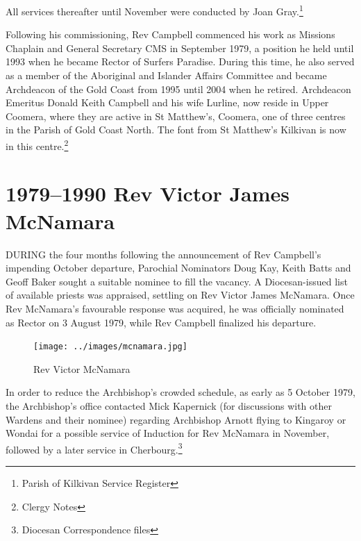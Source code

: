 All services thereafter until November were conducted by Joan Gray.\footnote{Parish of Kilkivan Service Register}


Following his commissioning, Rev Campbell commenced his work as Missions Chaplain and General Secretary CMS in September 1979, a position he held until 1993 when he became Rector of Surfers Paradise. During this time, he also served as a member of the Aboriginal and Islander Affairs Committee and became Archdeacon of the Gold Coast from 1995 until 2004 when he retired. Archdeacon Emeritus Donald Keith Campbell and his wife Lurline, now reside in Upper Coomera, where they are active in St Matthew's, Coomera, one of three centres in the Parish of Gold Coast North. The font from St Matthew's Kilkivan is now in this centre.\footnote{Clergy Notes}


\balance


\printendnotes[custom]
\setcounter{endnote}{0}
\chapter{1979--1990 Rev Victor James McNamara}
\nobalance


\lettrine[lines=3]{D}{URING}
 the four months following the announcement of Rev Campbell's impending October departure, Parochial Nominators Doug Kay, Keith Batts and Geoff Baker sought a suitable nominee to fill the vacancy. A Diocesan-issued list of available priests was appraised, settling on Rev Victor James McNamara. Once Rev McNamara's favourable response was acquired, he was officially nominated as Rector on 3 August 1979, while Rev Campbell finalized his departure.







\begin{figure}
\begin{center}
\texttt{[image: ../images/mcnamara.jpg]}
\caption{Rev Victor McNamara}
\end{center}
\end{figure}




In order to reduce the Archbishop's crowded schedule, as early as 5 October 1979, the Archbishop's office contacted Mick Kapernick (for discussions with other Wardens and their nominee) regarding Archbishop Arnott flying to Kingaroy or Wondai for a possible service of Induction for Rev McNamara in November, followed by a later service in Cherbourg.\footnote{Diocesan Correspondence files}


